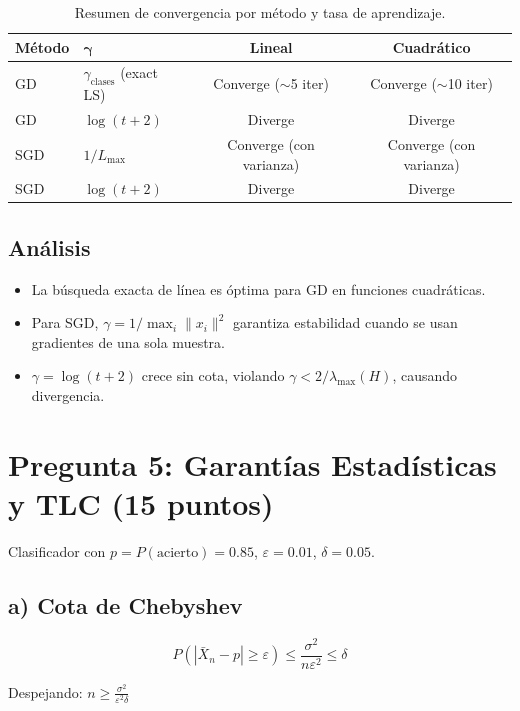 \documentclass[11pt,a4paper]{article}
\begin{document}
\begin{table}[h!]
\centering
\begin{tabular}{llcc}
\toprule
\textbf{Método} & $\boldsymbol{\gamma}$ & \textbf{Lineal} & \textbf{Cuadrático} \\
\midrule
GD & $\gamma_{\text{clases}}$ (exact LS) & Converge ($\sim$5 iter) & Converge ($\sim$10 iter) \\
GD & $\log(t+2)$ & Diverge & Diverge \\
SGD & $1/L_{\max}$ & Converge (con varianza) & Converge (con varianza) \\
SGD & $\log(t+2)$ & Diverge & Diverge \\
\bottomrule
\end{tabular}
\caption{Resumen de convergencia por método y tasa de aprendizaje.}
\label{tab:gd_results}
\end{table}

\subsection{Análisis}
\begin{itemize}
    \item La búsqueda exacta de línea es óptima para GD en funciones cuadráticas.
    \item Para SGD, $\gamma = 1/\max_i\|x_i\|^2$ garantiza estabilidad cuando se usan gradientes de una sola muestra.
    \item $\gamma = \log(t+2)$ crece sin cota, violando $\gamma < 2/\lambda_{\max}(H)$, causando divergencia.
\end{itemize}

\section{Pregunta 5: Garantías Estadísticas y TLC (15 puntos)}

Clasificador con $p = P(\text{acierto}) = 0.85$, $\varepsilon = 0.01$, $\delta = 0.05$.

\subsection{a) Cota de Chebyshev}

\[P(|\bar{X}_n - p| \geq \varepsilon) \leq \frac{\sigma^2}{n\varepsilon^2} \leq \delta\]

Despejando: $n \geq \frac{\sigma^2}{\varepsilon^2\delta}$
\end{document}
